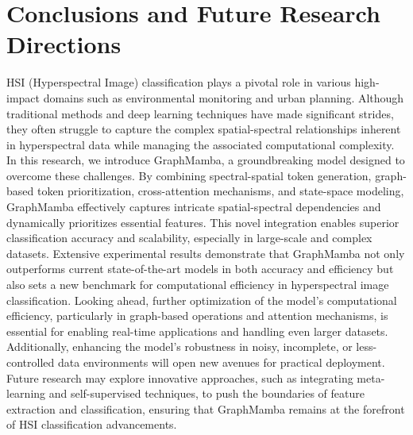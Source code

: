 \documentclass[journal]{IEEEtran}
\begin{document}
\section{Conclusions and Future Research Directions}
\label{Con}
HSI (Hyperspectral Image) classification plays a pivotal role in various high-impact domains such as environmental monitoring and urban planning. Although traditional methods and deep learning techniques have made significant strides, they often struggle to capture the complex spatial-spectral relationships inherent in hyperspectral data while managing the associated computational complexity. In this research, we introduce GraphMamba, a groundbreaking model designed to overcome these challenges. By combining spectral-spatial token generation, graph-based token prioritization, cross-attention mechanisms, and state-space modeling, GraphMamba effectively captures intricate spatial-spectral dependencies and dynamically prioritizes essential features. This novel integration enables superior classification accuracy and scalability, especially in large-scale and complex datasets. Extensive experimental results demonstrate that GraphMamba not only outperforms current state-of-the-art models in both accuracy and efficiency but also sets a new benchmark for computational efficiency in hyperspectral image classification. Looking ahead, further optimization of the model's computational efficiency, particularly in graph-based operations and attention mechanisms, is essential for enabling real-time applications and handling even larger datasets. Additionally, enhancing the model's robustness in noisy, incomplete, or less-controlled data environments will open new avenues for practical deployment. Future research may explore innovative approaches, such as integrating meta-learning and self-supervised techniques, to push the boundaries of feature extraction and classification, ensuring that GraphMamba remains at the forefront of HSI classification advancements.



\end{document}
